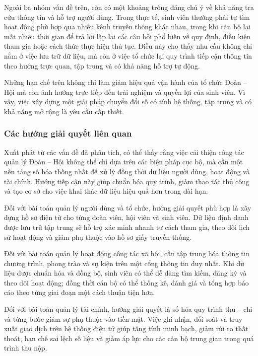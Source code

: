 Ngoài ba nhóm vấn đề trên, còn có một khoảng trống đáng chú ý về khả năng tra cứu thông tin và hỗ trợ người dùng. Trong thực tế, sinh viên thường phải tự tìm hoạt động phù hợp qua nhiều kênh truyền thông khác nhau, trong khi cán bộ lại mất nhiều thời gian để trả lời lặp lại các câu hỏi phổ biến về quy định, điều kiện tham gia hoặc cách thức thực hiện thủ tục. Điều này cho thấy nhu cầu không chỉ nằm ở việc lưu trữ dữ liệu, mà còn ở việc tổ chức lại quy trình tiếp cận thông tin theo hướng trực quan, tập trung và có khả năng hỗ trợ tự động.

Những hạn chế trên không chỉ làm giảm hiệu quả vận hành của tổ chức Đoàn -- Hội mà còn ảnh hưởng trực tiếp đến trải nghiệm và quyền lợi của sinh viên. Vì vậy, việc xây dựng một giải pháp chuyển đổi số có tính hệ thống, tập trung và có khả năng mở rộng là yêu cầu cấp thiết.

\subsubsection{Các hướng giải quyết liên quan}
Xuất phát từ các vấn đề đã phân tích, có thể thấy rằng việc cải thiện công tác quản lý Đoàn -- Hội không thể chỉ dựa trên các biện pháp cục bộ, mà cần một nền tảng số hóa thống nhất để xử lý đồng thời dữ liệu người dùng, hoạt động và tài chính. Hướng tiếp cận này giúp chuẩn hóa quy trình, giảm thao tác thủ công và tạo cơ sở cho việc khai thác dữ liệu hiệu quả hơn trong dài hạn.

Đối với bài toán quản lý người dùng và tổ chức, hướng giải quyết phù hợp là xây dựng hồ sơ điện tử cho từng đoàn viên, hội viên và sinh viên. Dữ liệu định danh được lưu trữ tập trung sẽ hỗ trợ xác minh nhanh tư cách tham gia, theo dõi lịch sử hoạt động và giảm phụ thuộc vào hồ sơ giấy truyền thống.

Đối với bài toán quản lý hoạt động công tác xã hội, cần tập trung hóa thông tin chương trình, phong trào và sự kiện trên một cổng thông tin duy nhất. Khi dữ liệu được chuẩn hóa và đồng bộ, sinh viên có thể dễ dàng tìm kiếm, đăng ký và theo dõi hoạt động; đồng thời cán bộ có thể thống kê, đánh giá và tổng hợp báo cáo theo từng giai đoạn một cách thuận tiện hơn.

Đối với bài toán quản lý tài chính, hướng giải quyết là số hóa quy trình thu -- chi và từng bước giảm sự phụ thuộc vào tiền mặt. Việc ghi nhận, đối soát và truy xuất giao dịch trên hệ thống điện tử giúp tăng tính minh bạch, giảm rủi ro thất thoát, hạn chế sai lệch số liệu và giảm áp lực cho các cán bộ trung gian trong quá trình thu nộp.


